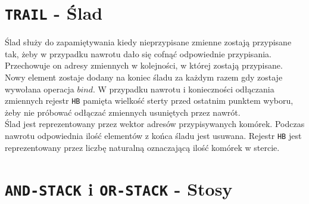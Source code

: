 \section{\texttt{TRAIL} - Ślad}

Ślad służy do zapamiętywania kiedy nieprzypisane zmienne zostają przypisane tak, żeby w przypadku nawrotu dało się cofnąć odpowiednie przypisania. Przechowuje on adresy zmiennych w kolejności, w której zostają przypisane. Nowy element zostaje dodany na koniec śladu za każdym razem gdy zostaje wywołana operacja $bind$. W przypadku nawrotu i konieczności odłączania zmiennych rejestr \texttt{HB} pamięta wielkość sterty przed ostatnim punktem wyboru, żeby nie próbować odłączać zmiennych usuniętych przez nawrót.\\
Ślad jest reprezentowany przez wektor adresów przypisywanych komórek. Podczas nawrotu odpowiednia ilość elementów z końca śladu jest usuwana. Rejestr \texttt{HB} jest reprezentowany przez liczbę naturalną oznaczającą ilość komórek w stercie.

\section{\texttt{AND-STACK} i \texttt{OR-STACK} - Stosy}

